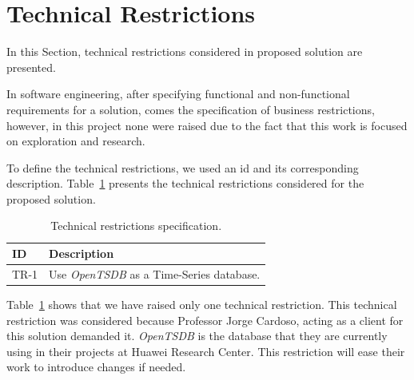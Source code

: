 \begin{itemize}
\end{itemize}

\section{Technical Restrictions}
\label{sec:technical_restrictions}

In this Section, technical restrictions considered in proposed solution are presented.

In software engineering, after specifying functional and non-functional requirements for a solution, comes the specification of business restrictions, however, in this project none were raised due to the fact that this work is focused on exploration and research.

To define the technical restrictions, we used an id and its corresponding description. Table~\ref{table:technical_restrictions_specification} presents the technical restrictions considered for the proposed solution.

\begin{table}[H]
    \caption{Technical restrictions specification.}
    \label{table:technical_restrictions_specification}
    \centering
    \begin{tabularx}{\linewidth} {
        |>{\hsize=0.25\hsize}X|
        >{\hsize=0.75\hsize}X| }
        \cline{1-2}
        \textbf{ID}
         & \textbf{Description}                           \\ \hline
        TR-1
         & Use \emph{OpenTSDB} as a Time-Series database. \\ \hline
    \end{tabularx}
\end{table}

Table~\ref{table:technical_restrictions_specification} shows that we have raised only one technical restriction. This technical restriction was considered because Professor Jorge Cardoso, acting as a client for this solution demanded it. \emph{OpenTSDB} is the database that they are currently using in their projects at Huawei Research Center. This restriction will ease their work to introduce changes if needed.

